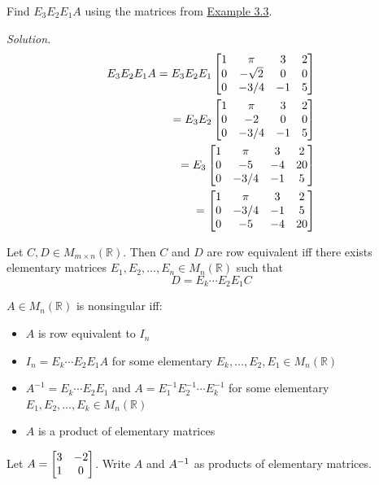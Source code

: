 \begin{example}
Find $E_3E_2E_1A$ using the matrices from \hyperref[example:3.3]{Example 3.3}.
\end{example}

\textit{Solution.} 
\[
\begin{aligned}
E_3E_2E_1A = E_3E_2E_1\begin{bmatrix} 1& \pi & 3 & 2 \\ 0 & -\sqrt{2} & 0 & 0 \\ 0 & -3/4 & -1 & 5 \end{bmatrix} \\
= E_3E_2\begin{bmatrix} 1 & \pi & 3 & 2 \\ 0 & -2 & 0 & 0 \\ 0 & -3/4 & -1 & 5 \end{bmatrix} \\
=E_3\begin{bmatrix} 1 & \pi & 3 & 2 \\ 0 & -5 & -4 & 20 \\ 0 & -3/4 & -1 & 5 \end{bmatrix} \\
=\begin{bmatrix} 1  & \pi & 3 & 2 \\ 0 & -3/4 & -1 & 5 \\ 0 & -5 & -4 & 20 \end{bmatrix}
\end{aligned}
\]

\begin{theorem}
Let $C, D \in M_{m \times n}(\mathbb{R})$. Then $C$ and $D$ are row equivalent iff there exists elementary matrices $E_1, E_2, \dots, E_n \in M_n(\mathbb{R})$ such that
$$D = E_k \cdots E_2E_1C$$
\end{theorem}

\begin{remark}
$A \in M_n(\mathbb{R})$ is nonsingular iff:
\begin{itemize}
    \item $A$ is row equivalent to $I_n$
    \item $I_n = E_k \cdots E_2E_1A$ for some elementary $E_k, \dots, E_2, E_1 \in M_n(\mathbb{R})$
    \item $A^{-1} = E_k \cdots E_2E_1$ and $A = E_1^{-1}E_2^{-1}\cdots E_k^{-1}$ for some elementary $E_1, E_2, \dots, E_k \in M_n(\mathbb{R})$
    \item $A$ is a product of elementary matrices
\end{itemize}
\end{remark}

\begin{example}
Let $A = \begin{bmatrix}  3 & -2 \\ 1 & 0 \end{bmatrix}$. Write $A$ and $A^{-1}$ as products of elementary matrices.
\end{example}

